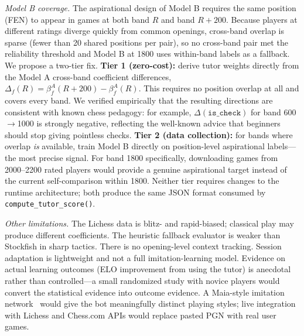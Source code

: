 \documentclass[11pt]{article}
\begin{document}
\emph{Model B coverage.} The aspirational design of Model B requires the same position (FEN) to appear in games at both band $R$ and band $R{+}200$. Because players at different ratings diverge quickly from common openings, cross-band overlap is sparse (fewer than 20 shared positions per pair), so no cross-band pair met the reliability threshold and Model B at 1800 uses within-band labels as a fallback. We propose a two-tier fix. \textbf{Tier 1 (zero-cost):} derive tutor weights directly from the Model A cross-band coefficient differences, $\Delta_f(R) = \beta^A_f(R{+}200) - \beta^A_f(R)$. This requires no position overlap at all and covers every band. We verified empirically that the resulting directions are consistent with known chess pedagogy: for example, $\Delta(\texttt{is\_check})$ for band 600$\to$1000 is strongly negative, reflecting the well-known advice that beginners should stop giving pointless checks. \textbf{Tier 2 (data collection):} for bands where overlap \emph{is} available, train Model B directly on position-level aspirational labels---the most precise signal. For band 1800 specifically, downloading games from 2000--2200 rated players would provide a genuine aspirational target instead of the current self-comparison within 1800. Neither tier requires changes to the runtime architecture; both produce the same JSON format consumed by \texttt{compute\_tutor\_score()}.

\emph{Other limitations.} The Lichess data is blitz- and rapid-biased; classical play may produce different coefficients. The heuristic fallback evaluator is weaker than Stockfish in sharp tactics. There is no opening-level context tracking. Session adaptation is lightweight and not a full imitation-learning model. Evidence on actual learning outcomes (ELO improvement from using the tutor) is anecdotal rather than controlled---a small randomized study with novice players would convert the statistical evidence into outcome evidence. A Maia-style imitation network~\cite{mcilroy2020aligning} would give the bot meaningfully distinct playing styles; live integration with Lichess and Chess.com APIs would replace pasted PGN with real user games.



\end{document}
